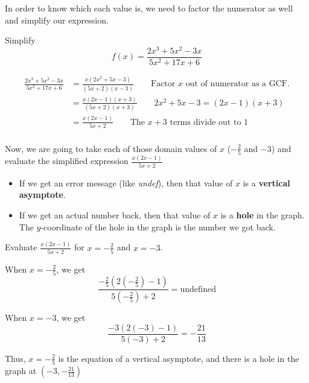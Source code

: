 In order to know which each value is, we need to factor the numerator as well and simplify our expression. \\

\begin{example}
Simplify 
\[
f(x) = \frac{2x^3 + 5x^2 - 3x}{5x^2 + 17x + 6}
\]
\end{example}

\begin{solution}
\begin{align*}
    \frac{2x^3 + 5x^2 - 3x}{5x^2 + 17x + 6} &= \frac{x(2x^2 + 5x - 3)}{(5x+2)(x-3)} \qquad \text{Factor $x$ out of numerator as a GCF.} \\[6pt]
    &= \frac{x(2x-1)(x+3)}{(5x+2)(x+3)} \qquad 2x^2 + 5x - 3 = (2x-1)(x+3) \\[6pt]
    &= \frac{x(2x-1)}{5x+2} \qquad \text{The $x+3$ terms divide out to 1} \\
\end{align*}
\end{solution}

Now, we are going to take each of those domain values of $x$ ($-\tfrac{2}{5}$ and $-3$) and evaluate the simplified expression $\frac{x(2x-1)}{5x+2}$

\begin{itemize}
    \item If we get an error message (like \textit{undef}), then that value of $x$ is a \textbf{vertical asymptote}.
    \item If we get an actual number back, then that value of $x$ is a \textbf{hole} in the graph. The $y$-coordinate of the hole in the graph is the number we got back.
\end{itemize}


\begin{example}
Evaluate $\frac{x(2x-1)}{5x+2}$ for $x = -\tfrac{2}{5}$ and $x = -3$. 
\end{example}

\begin{solution}

When $x = -\tfrac{2}{5}$, we get
\[
\frac{-\tfrac{2}{5}\left(2(-\tfrac{2}{5})-1\right)}{5\left(-\tfrac{2}{5}\right)+2} = \text{undefined}
\]

When $x = -3$, we get
\[
\frac{-3(2(-3)-1)}{5(-3)+2} = -\frac{21}{13}
\]

Thus, $x = -\tfrac{2}{5}$ is the equation of a vertical asymptote, and there is a hole in the graph at $\left(-3, -\tfrac{21}{13}\right)$
\end{solution}

